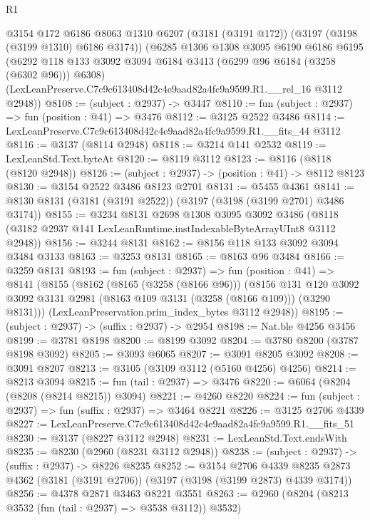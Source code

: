 \begin{lexlean}{R1}
\begin{coremodule}
  @3154
    @172
    @6186
    @8063
    @1310
    @6207
    (@3181 (@3191 @172))
    (@3197 (@3198 (@3199 @1310) @6186 @3174))
    (@6285
      @1306
      @1308
      @3095
      @6190
      @6186
      @6195
      (@6292 @118 @133 @3092 @3094 @6184 @3413 (@6299 @96 @6184 (@3258 (@6302 @96))) @6308)
      (LexLeanPreserve.C7c9c613408d42c4e9aad82a4fc9a9599.R1.__rel_16 @3112 @2948))
@8108 := (subject : @2937) -> @3447
@8110 := fun (subject : @2937) => fun (position : @41) => @3476
@8112 := @3125 @2522 @3486
@8114 := LexLeanPreserve.C7c9c613408d42c4e9aad82a4fc9a9599.R1.__fits_44 @3112
@8116 := @3137 (@8114 @2948)
@8118 := @3214 @141 @2532
@8119 := LexLeanStd.Text.byteAt
@8120 := @8119 @3112
@8123 := @8116 (@8118 (@8120 @2948))
@8126 := (subject : @2937) -> (position : @41) -> @8112 @8123
@8130 := @3154 @2522 @3486 @8123 @2701
@8131 := @5455 @4361
@8141 := @8130 @8131 (@3181 (@3191 @2522)) (@3197 (@3198 (@3199 @2701) @3486 @3174))
@8155 := @3234
    @8131
    @2698
    @1308
    @3095
    @3092
    @3486
    (@8118 (@3182 @2937 @141 LexLeanRuntime.instIndexableByteArrayUInt8 @3112 @2948))
@8156 := @3244 @8131
@8162 := @8156 @118 @133 @3092 @3094 @3484 @3133
@8163 := @3253 @8131
@8165 := @8163 @96 @3484
@8166 := @3259 @8131
@8193 := fun (subject : @2937) =>
  fun (position : @41) =>
  @8141
    (@8155
      (@8162
        (@8165 (@3258 (@8166 @96)))
        (@8156
          @131
          @120
          @3092
          @3092
          @3131
          @2981
          (@8163 @109 @3131 (@3258 (@8166 @109)))
          (@3290 @8131)))
      (LexLeanPreservation.prim_index_bytes @3112 @2948))
@8195 := (subject : @2937) -> (suffix : @2937) -> @2954
@8198 := Nat.ble @4256 @3456
@8199 := @3781 @8198
@8200 := @8199 @3092
@8204 := @3780 @8200 (@3787 @8198 @3092)
@8205 := @3093 @6065
@8207 := @3091 @8205 @3092
@8208 := @3091 @8207
@8213 := @3105 (@3109 @3112 (@5160 @4256) @4256)
@8214 := @8213 @3094
@8215 := fun (tail : @2937) => @3476
@8220 := @6064 (@8204 (@8208 (@8214 @8215)) @3094)
@8221 := @4260 @8220
@8224 := fun (subject : @2937) => fun (suffix : @2937) => @3464 @8221
@8226 := @3125 @2706 @4339
@8227 := LexLeanPreserve.C7c9c613408d42c4e9aad82a4fc9a9599.R1.__fits_51
@8230 := @3137 (@8227 @3112 @2948)
@8231 := LexLeanStd.Text.endsWith
@8235 := @8230 (@2960 (@8231 @3112 @2948))
@8238 := (subject : @2937) -> (suffix : @2937) -> @8226 @8235
@8252 := @3154
    @2706
    @4339
    @8235
    @2873
    @4362
    (@3181 (@3191 @2706))
    (@3197 (@3198 (@3199 @2873) @4339 @3174))
@8256 := @4378 @2871 @3463 @8221 @3551
@8263 := @2960 (@8204 (@8213 @3532 (fun (tail : @2937) => @3538 @3112)) @3532)

\end{coremodule}
\end{lexlean}
